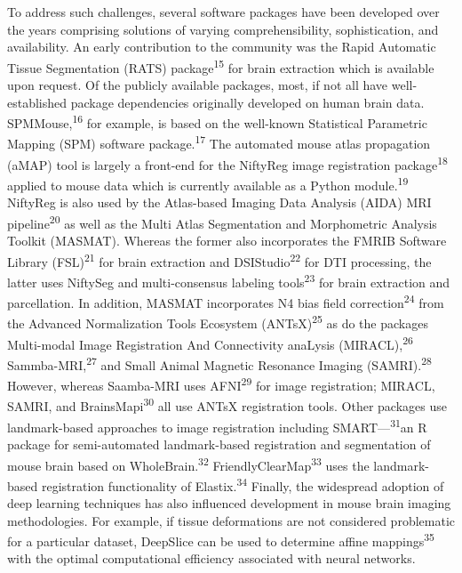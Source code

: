 \documentclass[
  12pt,
]{article}
\begin{document}
To address such challenges, several software packages have been
developed over the years comprising solutions of varying
comprehensibility, sophistication, and availability. An early
contribution to the community was the Rapid Automatic Tissue
Segmentation (RATS) package\textsuperscript{15} for brain extraction
which is available upon request. Of the publicly available packages,
most, if not all have well-established package dependencies originally
developed on human brain data. SPMMouse,\textsuperscript{16} for
example, is based on the well-known Statistical Parametric Mapping (SPM)
software package.\textsuperscript{17} The automated mouse atlas
propagation (aMAP) tool is largely a front-end for the NiftyReg image
registration package\textsuperscript{18} applied to mouse data which is
currently available as a Python module.\textsuperscript{19} NiftyReg is
also used by the Atlas-based Imaging Data Analysis (AIDA) MRI
pipeline\textsuperscript{20} as well as the Multi Atlas Segmentation and
Morphometric Analysis Toolkit (MASMAT). Whereas the former also
incorporates the FMRIB Software Library (FSL)\textsuperscript{21} for
brain extraction and DSIStudio\textsuperscript{22} for DTI processing,
the latter uses NiftySeg and multi-consensus labeling
tools\textsuperscript{23} for brain extraction and parcellation. In
addition, MASMAT incorporates N4 bias field
correction\textsuperscript{24} from the Advanced Normalization Tools
Ecosystem (ANTsX)\textsuperscript{25} as do the packages Multi-modal
Image Registration And Connectivity anaLysis
(MIRACL),\textsuperscript{26} Sammba-MRI,\textsuperscript{27} and Small
Animal Magnetic Resonance Imaging (SAMRI).\textsuperscript{28} However,
whereas Saamba-MRI uses AFNI\textsuperscript{29} for image registration;
MIRACL, SAMRI, and BrainsMapi\textsuperscript{30} all use ANTsX
registration tools. Other packages use landmark-based approaches to
image registration including SMART---\textsuperscript{31}an R package
for semi-automated landmark-based registration and segmentation of mouse
brain based on WholeBrain.\textsuperscript{32}
FriendlyClearMap\textsuperscript{33} uses the landmark-based
registration functionality of Elastix.\textsuperscript{34} Finally, the
widespread adoption of deep learning techniques has also influenced
development in mouse brain imaging methodologies. For example, if tissue
deformations are not considered problematic for a particular dataset,
DeepSlice can be used to determine affine mappings\textsuperscript{35}
with the optimal computational efficiency associated with neural
networks.
\end{document}
